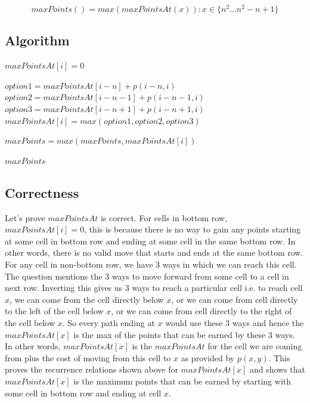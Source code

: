 \documentclass{article}
\begin{document}
    \begin{equation*}
        maxPoints() = max(maxPointsAt(x)) : x \in \{ n^2 \dots n^2-n+1 \}
    \end{equation*}

    \subsection*{Algorithm}
        \begin{algorithm}[H]
            \begin{algorithmic}
                        \State $maxPointsAt[i] = 0$
                    \EndFor

                        \State $option1 = maxPointsAt[i-n] + p(i-n, i)$
                            \State $option2 = maxPointsAt[i-n-1] + p(i-n-1, i)$
                        \EndIf
                            \State $option3 = maxPointsAt[i-n+1] + p(i-n+1, i)$
                        \EndIf
                        \State $maxPointsAt[i] = max(option1, option2, option3)$
                    \EndFor

                        \State $maxPoints = max(maxPoints, maxPointsAt[i])$
                    \EndFor

                    \State \Return $maxPoints$
                \EndProcedure
            \end{algorithmic}
        \end{algorithm}

    \subsection*{Correctness}
    Let's prove $maxPointsAt$ is correct. For cells in bottom row, $maxPointsAt[i] = 0$, this is because there is no way to gain any points starting at some cell in bottom row and ending at some cell in the same bottom row. In other words, there is no valid move that starts and ends at the same bottom row. For any cell in non-bottom row, we have 3 ways in which we can reach this cell. The question mentions the 3 ways to move forward from some cell to a cell in next row. Inverting this gives us 3 ways to reach a particular cell i.e. to reach cell $x$, we can come from the cell directly below $x$, or we can come from cell directly to the left of the cell below $x$, or we can come from cell directly to the right of the cell below $x$. So every path ending at $x$ would use these 3 ways and hence the $maxPointsAt[x]$ is the max of the points that can be earned by these 3 ways. In other words, $maxPointsAt[x]$ is the $maxPointsAt$ for the cell we are coming from plus the cost of moving from this cell to $x$ as provided by $p(x,y)$. This proves the recurrence relations shown above for $maxPointsAt[x]$ and shows that $maxPointsAt[x]$ is the maximum points that can be earned by starting with some cell in bottom row and ending at cell $x$.
\end{document}

